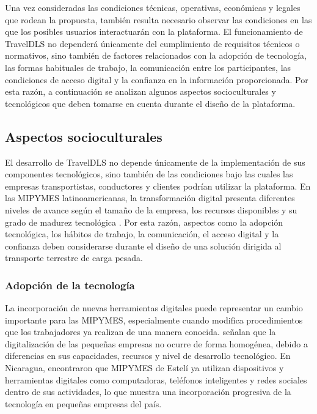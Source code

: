 Una vez consideradas las condiciones técnicas, operativas, económicas y legales que rodean la propuesta, también resulta necesario observar las condiciones en las que los posibles usuarios interactuarán con la plataforma. El funcionamiento de TravelDLS no dependerá únicamente del cumplimiento de requisitos técnicos o normativos, sino también de factores relacionados con la adopción de tecnología, las formas habituales de trabajo, la comunicación entre los participantes, las condiciones de acceso digital y la confianza en la información proporcionada. Por esta razón, a continuación se analizan algunos aspectos socioculturales y tecnológicos que deben tomarse en cuenta durante el diseño de la plataforma.

\subsection{Aspectos socioculturales}
\label{sec:aspectos-socioculturales}

El desarrollo de TravelDLS no depende únicamente de la implementación de sus componentes tecnológicos, sino también de las condiciones bajo las cuales las empresas transportistas, conductores y clientes podrían utilizar la plataforma. En las MIPYMES latinoamericanas, la transformación digital presenta diferentes niveles de avance según el tamaño de la empresa, los recursos disponibles y su grado de madurez tecnológica \parencite{dini2021transformacion}. Por esta razón, aspectos como la adopción tecnológica, los hábitos de trabajo, la comunicación, el acceso digital y la confianza deben considerarse durante el diseño de una solución dirigida al transporte terrestre de carga pesada.

\subsubsection{Adopción de la tecnología}
\label{sec:adopcion-tecnologia}

La incorporación de nuevas herramientas digitales puede representar un cambio importante para las MIPYMES, especialmente cuando modifica procedimientos que los trabajadores ya realizan de una manera conocida. \textcite{dini2021transformacion} señalan que la digitalización de las pequeñas empresas no ocurre de forma homogénea, debido a diferencias en sus capacidades, recursos y nivel de desarrollo tecnológico. En Nicaragua, \textcite{barreda2023economia} encontraron que MIPYMES de Estelí ya utilizan dispositivos y herramientas digitales como computadoras, teléfonos inteligentes y redes sociales dentro de sus actividades, lo que muestra una incorporación progresiva de la tecnología en pequeñas empresas del país.

